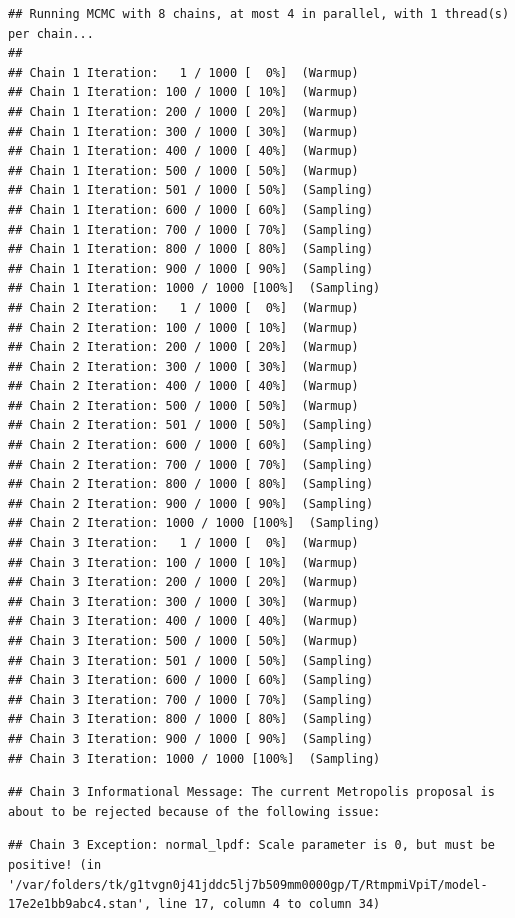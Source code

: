 \documentclass[
]{book}
\begin{document}
\begin{verbatim}
## Running MCMC with 8 chains, at most 4 in parallel, with 1 thread(s) per chain...
## 
## Chain 1 Iteration:   1 / 1000 [  0%]  (Warmup) 
## Chain 1 Iteration: 100 / 1000 [ 10%]  (Warmup) 
## Chain 1 Iteration: 200 / 1000 [ 20%]  (Warmup) 
## Chain 1 Iteration: 300 / 1000 [ 30%]  (Warmup) 
## Chain 1 Iteration: 400 / 1000 [ 40%]  (Warmup) 
## Chain 1 Iteration: 500 / 1000 [ 50%]  (Warmup) 
## Chain 1 Iteration: 501 / 1000 [ 50%]  (Sampling) 
## Chain 1 Iteration: 600 / 1000 [ 60%]  (Sampling) 
## Chain 1 Iteration: 700 / 1000 [ 70%]  (Sampling) 
## Chain 1 Iteration: 800 / 1000 [ 80%]  (Sampling) 
## Chain 1 Iteration: 900 / 1000 [ 90%]  (Sampling) 
## Chain 1 Iteration: 1000 / 1000 [100%]  (Sampling) 
## Chain 2 Iteration:   1 / 1000 [  0%]  (Warmup) 
## Chain 2 Iteration: 100 / 1000 [ 10%]  (Warmup) 
## Chain 2 Iteration: 200 / 1000 [ 20%]  (Warmup) 
## Chain 2 Iteration: 300 / 1000 [ 30%]  (Warmup) 
## Chain 2 Iteration: 400 / 1000 [ 40%]  (Warmup) 
## Chain 2 Iteration: 500 / 1000 [ 50%]  (Warmup) 
## Chain 2 Iteration: 501 / 1000 [ 50%]  (Sampling) 
## Chain 2 Iteration: 600 / 1000 [ 60%]  (Sampling) 
## Chain 2 Iteration: 700 / 1000 [ 70%]  (Sampling) 
## Chain 2 Iteration: 800 / 1000 [ 80%]  (Sampling) 
## Chain 2 Iteration: 900 / 1000 [ 90%]  (Sampling) 
## Chain 2 Iteration: 1000 / 1000 [100%]  (Sampling) 
## Chain 3 Iteration:   1 / 1000 [  0%]  (Warmup) 
## Chain 3 Iteration: 100 / 1000 [ 10%]  (Warmup) 
## Chain 3 Iteration: 200 / 1000 [ 20%]  (Warmup) 
## Chain 3 Iteration: 300 / 1000 [ 30%]  (Warmup) 
## Chain 3 Iteration: 400 / 1000 [ 40%]  (Warmup) 
## Chain 3 Iteration: 500 / 1000 [ 50%]  (Warmup) 
## Chain 3 Iteration: 501 / 1000 [ 50%]  (Sampling) 
## Chain 3 Iteration: 600 / 1000 [ 60%]  (Sampling) 
## Chain 3 Iteration: 700 / 1000 [ 70%]  (Sampling) 
## Chain 3 Iteration: 800 / 1000 [ 80%]  (Sampling) 
## Chain 3 Iteration: 900 / 1000 [ 90%]  (Sampling) 
## Chain 3 Iteration: 1000 / 1000 [100%]  (Sampling)
\end{verbatim}

\begin{verbatim}
## Chain 3 Informational Message: The current Metropolis proposal is about to be rejected because of the following issue:
\end{verbatim}

\begin{verbatim}
## Chain 3 Exception: normal_lpdf: Scale parameter is 0, but must be positive! (in '/var/folders/tk/g1tvgn0j41jddc5lj7b509mm0000gp/T/RtmpmiVpiT/model-17e2e1bb9abc4.stan', line 17, column 4 to column 34)
\end{verbatim}
\end{document}
